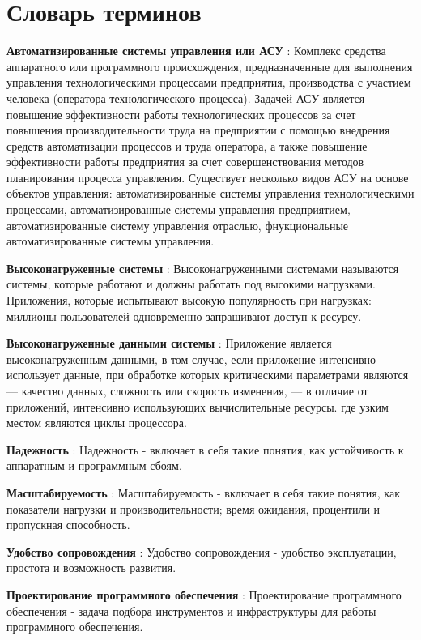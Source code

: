 \chapter*{Словарь терминов}             %
\label{ch:tez}  %

\textbf{Автоматизированные системы управления или АСУ} : Комплекс средства аппаратного или программного происхождения, предназначенные для выполнения управления технологическими процессами предприятия, производства с участием человека (оператора технологического процесса). Задачей АСУ является повышение эффективности работы технологических процессов за счет повышения производительности труда на предприятии с помощью внедрения средств автоматизации процессов и труда оператора, а также повышение эффективности работы предприятия за счет совершенствования методов планирования процесса управления. Существует несколько видов АСУ на основе объектов управления: автоматизированные системы управления технологическими процессами, автоматизированные системы управления предприятием, автоматизированные систему управления отраслью, фнукциональные автоматизированные системы управления.  

\textbf{Высоконагруженные системы} : Высоконагруженными системами называются системы, которые работают и должны работать под высокими нагрузками. Приложения, которые испытывают высокую популярность при нагрузках: миллионы пользователей одновременно запрашивают доступ к ресурсу.

\textbf{Высоконагруженные данными системы} : Приложение является высоконагруженным данными, в том случае, если приложение интенсивно использует данные, при обработке которых критическими параметрами являются — качество данных, сложность или скорость изменения, — в отличие от приложений, интенсивно использующих вычислительные ресурсы.
где узким местом являются циклы процессора.

\textbf{Надежность} :  Надежность - включает в себя такие понятия, как устойчивость к аппаратным и программным сбоям. 

\textbf{Масштабируемость} : Масштабируемость - включает в себя такие понятия, как показатели нагрузки и производительности; время ожидания, процентили и пропускная способность.

\textbf{Удобство сопровождения} :  Удобство сопровождения - удобство эксплуатации, простота и возможность развития.

\textbf{Проектирование программного обеспечения} : Проектирование программного обеспечения - задача подбора инструментов и инфраструктуры для работы программного обеспечения.

